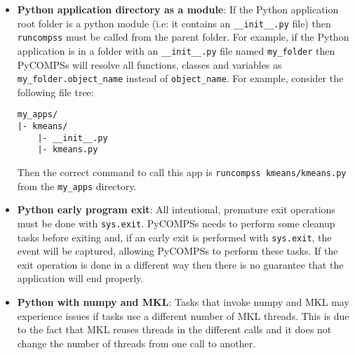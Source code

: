 \begin{itemize}
\item \textbf{Python application directory as a module}:\newline
If the Python application root folder is a python module (i.e: it contains an \verb|__init__.py| file) then \verb|runcompss| must be called from
the parent folder. For example, if the Python application is in a folder with an \verb|__init__.py| file named \verb|my_folder| then PyCOMPSs will
resolve all functions, classes and variables as \verb|my_folder.object_name| instead of \verb|object_name|. For example, consider the following file
tree:
\begin{lstlisting}[]
my_apps/
|- kmeans/
    |- __init__.py
    |- kmeans.py
\end{lstlisting}
Then the correct command to call this app is \verb|runcompss kmeans/kmeans.py| from the \verb|my_apps| directory.

\item \textbf{Python early program exit}:\newline
All intentional, premature exit operations must be done with \verb|sys.exit|. PyCOMPSs needs to perform some cleanup tasks before exiting and, if an early exit is performed with \verb|sys.exit|, the event will be captured,
allowing PyCOMPSs to perform these tasks. If the exit operation is done in a different way then there is no guarantee that the application will end properly.

\item \textbf{Python with numpy and MKL}:\newline
Tasks that invoke numpy and MKL may experience issues if tasks use a different number of MKL threads. This is due to the fact that MKL reuses 
threads in the different calls and it does not change the number of threads from one call to another.


\end{itemize}

